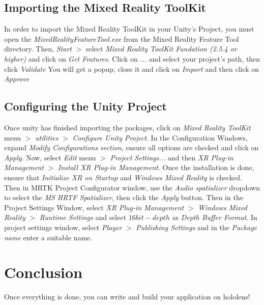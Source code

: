 \documentclass[12pt]{article}
\begin{document}
\subsection{Importing the Mixed Reality ToolKit}
In order to import the Mixed Reality ToolKit in your Unity's Project, you must open the \emph{MixedRealityFeatureTool.exe} from the Mixed Reality Feature Tool directory.
Then, \emph{Start} $>$ select \emph{Mixed Reality ToolKit Fundation (2.5.4 or higher)} and click on \emph{Get Features}.
Click on \emph{...} and select your project's path, then click \emph{Validate}
You will get a popup, close it and click on \emph{Import} and then click on \emph{Approve}

\subsection{Configuring the Unity Project}
Once unity has finished importing the packages, click on \emph{Mixed Reality ToolKit} menu $>$ \emph{utilities} $>$ \emph{Configure Unity Project}.
In the Configuration Windows, expand \emph{Modify Configurations section}, ensure all options are checked and click on \emph{Apply}.
Now, select \emph{Edit} menu $>$ \emph{Project Settings...} and then \emph{XR Plug-in Management} $>$ \emph{Install XR Plug-in Management}. Once the installation is done, ensure that \emph{Initialize XR on Startup} and \emph{Windows Mixed Reality} is checked.
Then in MRTK Project Configurator window, use the \emph{Audio spatializer} dropdown to select the \emph{MS HRTF Spatializer}, then click the \emph{Apply} button.
Then in the Project Settings Window, select \emph{XR Plug-in Management} $>$ \emph{Windows Mixed Reality} $>$ \emph{Runtime Settings} and select $16 bit-depth$ as \emph{Depth Buffer Format}.
In project settings window, select \emph{Player} $>$ \emph{Publishing Settings} and in the \emph{Package name} enter a suitable name.




\section{Conclusion}
Once everything is done, you can write and build your application on hololens!
\end{document}
